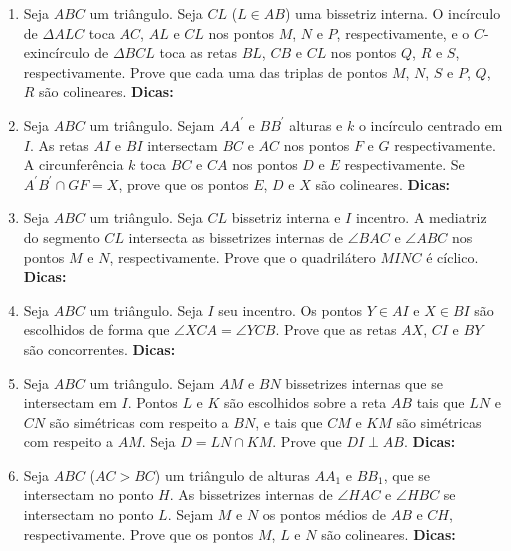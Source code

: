 \documentclass{article}
\newcommand{\dica}{\textbf{Dicas:}}
\newcommand{\iniTri}{Seja $ABC$ um triângulo}
\begin{document}
\begin{multicols}{2}
\begin{enumerate}
    \item \iniTri. Seja $CL$ ($L\in AB$) uma bissetriz interna. O incírculo de $\Delta ALC$ toca $AC$, $AL$ e $CL$ nos pontos $M$, $N$ e $P$, respectivamente, e o $C$-exincírculo de $\Delta BCL$ toca as retas $BL$, $CB$ e $CL$ nos pontos $Q$, $R$ e $S$, respectivamente. Prove que cada uma das triplas de pontos $M$, $N$, $S$ e $P$, $Q$, $R$ são colineares. \dica %
    
    \item \iniTri. Sejam $AA^{\prime}$ e $BB^{\prime}$ alturas e $k$ o incírculo centrado em $I$. As retas $AI$ e $BI$ intersectam $BC$ e $AC$ nos pontos $F$ e $G$ respectivamente. A circunferência $k$ toca $BC$ e $CA$ nos pontos $D$ e $E$ respectivamente. Se $A^{\prime}B^{\prime}\cap GF=X$, prove que os pontos $E$, $D$ e $X$ são colineares. \dica %
    
    \item \iniTri. Seja $CL$ bissetriz interna e $I$ incentro. A mediatriz do segmento $CL$ intersecta as bissetrizes internas de $\angle BAC$ e $\angle ABC$ nos pontos $M$ e $N$, respectivamente. Prove que o quadrilátero $MINC$ é cíclico. \dica %
    
    \item \iniTri. Seja $I$ seu incentro. Os pontos $Y\in AI$ e $X\in BI$ são escolhidos de forma que $\angle XCA=\angle YCB$. Prove que as retas $AX$, $CI$ e $BY$ são concorrentes. \dica %
    
    \item \iniTri. Sejam $AM$ e $BN$ bissetrizes internas que se intersectam em $I$. Pontos $L$ e $K$ são escolhidos sobre a reta $AB$ tais que $LN$ e $CN$ são simétricas com respeito a $BN$, e tais que $CM$ e $KM$ são simétricas com respeito a $AM$. Seja $D=LN\cap KM$. Prove que $DI\perp AB$. \dica %
    
    \item Seja $ABC$ ($AC>BC$) um triângulo de alturas $AA_1$ e $BB_1$, que se intersectam no ponto $H$. As bissetrizes internas de $\angle HAC$ e $\angle HBC$ se intersectam no ponto $L$. Sejam $M$ e $N$ os pontos médios de $AB$ e $CH$, respectivamente. Prove que os pontos $M$, $L$ e $N$ são colineares. \dica %
    

\end{enumerate}
\end{multicols}
\end{document}
